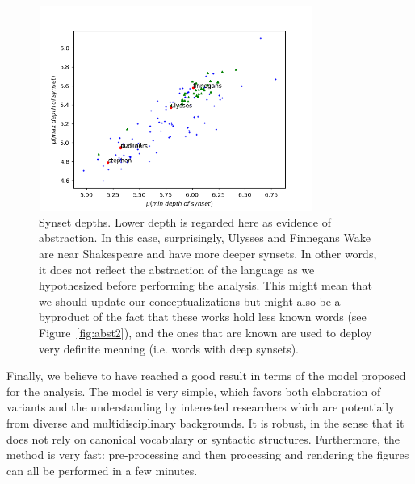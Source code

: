 \documentclass[12pt,fleqn]{article}
\begin{document}
\begin{figure}[!htbp] %
\vspace{-2pt}
\begin{center}
\includegraphics[height=6.7cm,width=9cm]{figs/abst1}%
\caption{Synset depths. Lower depth is regarded here as evidence of abstraction. 
    In this case, surprisingly, Ulysses and Finnegans Wake are near Shakespeare and have more deeper synsets.
    In other words, it does not reflect the abstraction of the language as we hypothesized before performing the analysis.
    This might mean that we should update our conceptualizations but might also be a byproduct of the fact that these works hold less known words (see Figure~\ref{fig:abst2}), and the ones that are known are used to deploy very definite meaning (i.e. words with deep synsets).}
\label{fig:abst1}%
\end{center}
\end{figure}

Finally,
we believe to have reached a good result in terms of the
model proposed for the analysis.
The model is very simple, which favors both elaboration of
variants and the understanding by interested researchers which are potentially from
diverse and multidisciplinary backgrounds.
It is robust, in the sense that it does not rely on canonical vocabulary or syntactic structures.
Furthermore, the method is very fast:
pre-processing and then processing and rendering the figures can all be performed in 
a few minutes.
\end{document}
